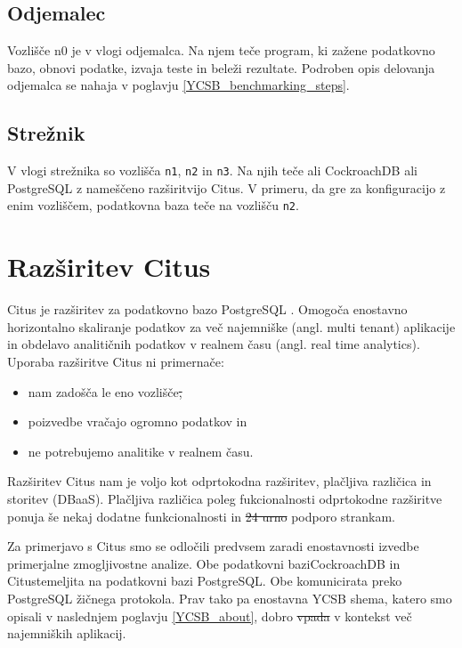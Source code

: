 \documentclass[a4paper, 12pt]{book}
\providecommand{\DIFaddtex}[1]{{\protect\color{blue}\uwave{#1}}} %
\providecommand{\DIFdeltex}[1]{{\protect\color{red}\sout{#1}}}                      %
\providecommand{\DIFaddbegin}{} %
\providecommand{\DIFaddend}{} %
\providecommand{\DIFdelbegin}{} %
\providecommand{\DIFdelend}{} %
\providecommand{\DIFadd}[1]{\texorpdfstring{\DIFaddtex{#1}}{#1}} %
\providecommand{\DIFdel}[1]{\texorpdfstring{\DIFdeltex{#1}}{}} %
\newcommand{\DIFscaledelfig}{0.5}
\newlength{\DIFdelgraphicswidth} %
\newlength{\DIFdelgraphicsheight} %
\newcommand{\DIFaddincludegraphics}[2][]{{\color{blue}\fbox{\DIFOincludegraphics[#1]{#2}}}} %
\newcommand{\DIFdelincludegraphics}[2][]{%
\sbox{\DIFdelgraphicsbox}{\DIFOincludegraphics[#1]{#2}}%
\settoboxwidth{\DIFdelgraphicswidth}{\DIFdelgraphicsbox} %
\settoboxtotalheight{\DIFdelgraphicsheight}{\DIFdelgraphicsbox} %
\scalebox{\DIFscaledelfig}{%
\parbox[b]{\DIFdelgraphicswidth}{\usebox{\DIFdelgraphicsbox}\\[-\baselineskip] \rule{\DIFdelgraphicswidth}{0em}}\llap{\resizebox{\DIFdelgraphicswidth}{\DIFdelgraphicsheight}{%
\setlength{\unitlength}{\DIFdelgraphicswidth}%
\begin{picture}(1,1)%
\thicklines\linethickness{2pt} %
{\color[rgb]{1,0,0}\put(0,0){\framebox(1,1){}}}%
{\color[rgb]{1,0,0}\put(0,0){\line( 1,1){1}}}%
{\color[rgb]{1,0,0}\put(0,1){\line(1,-1){1}}}%
\end{picture}%
}\hspace*{3pt}}} %
} %
\DeclareRobustCommand{\DIFaddbegin}{\DIFOaddbegin \let\includegraphics\DIFaddincludegraphics} %
\DeclareRobustCommand{\DIFaddend}{\DIFOaddend \let\includegraphics\DIFOincludegraphics} %
\DeclareRobustCommand{\DIFdelbegin}{\DIFOdelbegin \let\includegraphics\DIFdelincludegraphics} %
\DeclareRobustCommand{\DIFdelend}{\DIFOaddend \let\includegraphics\DIFOincludegraphics} %
\begin{document}
\subsection{Odjemalec}
Vozlišče n0 je v vlogi odjemalca. Na njem teče program, ki zažene podatkovno bazo, obnovi podatke, izvaja teste in beleži rezultate. Podroben opis delovanja odjemalca se nahaja v poglavju \ref{YCSB_benchmarking_steps}.

\subsection{Strežnik}
V vlogi strežnika so vozlišča \texttt{n1}, \texttt{n2} in \texttt{n3}. Na njih teče ali CockroachDB ali PostgreSQL z nameščeno razširitvijo Citus. V primeru, da gre za konfiguracijo z enim vozliščem, podatkovna baza teče na vozlišču \texttt{n2}.

\section{Razširitev Citus}
\label{benchmarking/citus}
Citus je razširitev za podatkovno bazo PostgreSQL \cite{citus}. Omogoča enostavno horizontalno skaliranje podatkov za več najemniške (angl. multi tenant) aplikacije in obdelavo analitičnih podatkov v realnem času (angl. real time analytics). Uporaba razširitve Citus ni primerna\DIFaddbegin \DIFadd{, }\DIFaddend če:
\begin{itemize}
    \item nam zadošča le eno vozlišče\DIFdelbegin \DIFdel{,
    }\DIFdelend \DIFaddbegin \DIFadd{;
    }\DIFaddend \item poizvedbe vračajo ogromno podatkov in
    \item ne potrebujemo analitike v realnem času.
\end{itemize}

Razširitev Citus nam je voljo kot odprtokodna razširitev, plačljiva različi\-ca in storitev (DBaaS). Plačljiva različica poleg fukcionalnosti odprtokodne raz\-širitve ponuja še nekaj dodatne funkcionalnosti in \DIFdelbegin \DIFdel{24 urno }\DIFdelend \DIFaddbegin \DIFadd{24-urno }\DIFaddend podporo strankam.

Za primerjavo s Citus smo se odločili predvsem zaradi enostavnosti izvedbe primerjalne zmogljivostne analize. Obe podatkovni bazi\DIFaddbegin \DIFadd{, }\DIFaddend CockroachDB in Citus\DIFaddbegin \DIFadd{, }\DIFaddend temeljita na podatkovni bazi PostgreSQL. Obe komunicirata preko PostgreSQL žičnega protokola. Prav tako pa enostavna YCSB shema, katero smo opisali v naslednjem poglavju \ref{YCSB_about}, dobro \DIFdelbegin \DIFdel{vpada }\DIFdelend \DIFaddbegin \DIFadd{spada }\DIFaddend v kontekst več najemniških aplikacij.
\end{document}
